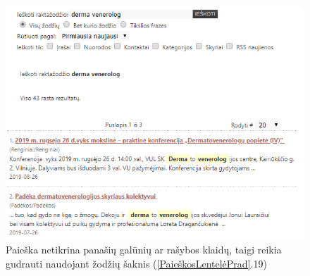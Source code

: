 \documentclass{VUMIFPSkursinis}
\begin{document}
\begin{figure}[H]
    \centering
    \includegraphics[scale=0.8]{img/ProtingaPaieška}
    \caption{Paieška netikrina panašių galūnių ar rašybos klaidų, taigi reikia gudrauti naudojant žodžių šaknis (\ref{PaieškosLentelėPrad}.19)}
    \label{img:protingapaieška}
\end{figure}

\pagebreak
\end{document}
